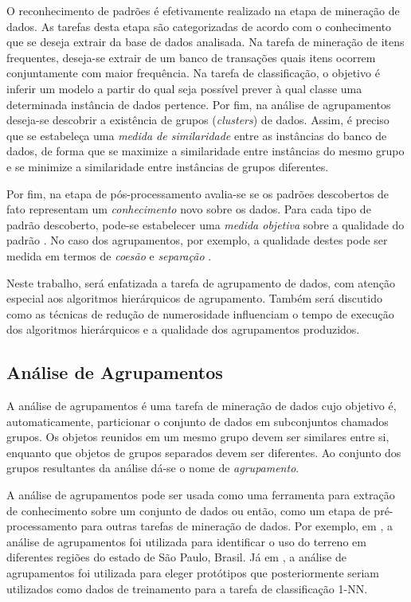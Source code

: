 O reconhecimento de padrões é efetivamente realizado na etapa de mineração de
dados. As tarefas desta etapa são categorizadas de acordo com o conhecimento que
se deseja extrair da base de dados analisada. Na tarefa de mineração de itens
frequentes, deseja-se extrair de um banco de transações quais itens ocorrem
conjuntamente com maior frequência. Na tarefa de classificação, o objetivo é
inferir um modelo a partir do qual seja possível prever à qual classe uma
determinada instância de dados pertence. Por fim, na análise de agrupamentos
deseja-se descobrir a existência de grupos (\emph{clusters}) de dados. Assim, é
preciso que se estabeleça uma \emph{medida de similaridade} entre as instâncias
do banco de dados, de forma que se maximize a similaridade entre instâncias do
mesmo grupo e se minimize a similaridade entre instâncias de grupos diferentes.

Por fim, na etapa de pós-processamento avalia-se se os padrões descobertos de
fato representam um \emph{conhecimento} novo sobre os dados. Para cada tipo
de padrão descoberto, pode-se estabelecer uma \emph{medida objetiva} sobre a
qualidade do padrão \cite{han2011data}. No caso dos agrupamentos, por exemplo,
a qualidade destes pode ser medida em termos de \emph{coesão} e \emph{separação}
\cite{tan2009introducao}.

Neste trabalho, será enfatizada a tarefa de agrupamento de dados, com atenção
especial aos algoritmos hierárquicos de agrupamento. Também será discutido como
as técnicas de redução de numerosidade influenciam o tempo de execução dos
algoritmos hierárquicos e a qualidade dos agrupamentos produzidos.


\subsection{Análise de Agrupamentos}
	\label{subsec:analise_agrupamentos}
	
A análise de agrupamentos é uma tarefa de mineração de dados cujo objetivo é,
automaticamente, particionar o conjunto de dados em subconjuntos chamados
grupos. Os objetos reunidos em um mesmo grupo devem ser similares entre si,
enquanto que objetos de grupos separados devem ser diferentes. Ao conjunto dos
grupos resultantes da análise dá-se o nome de \emph{agrupamento}.

A análise de agrupamentos pode ser usada como uma ferramenta para extração de
conhecimento sobre um conjunto de dados ou então, como um etapa de
pré-processamento para outras tarefas de mineração de dados. Por exemplo, em
\cite{gonccalves2014land}, a análise de agrupamentos foi utilizada para
identificar o uso do terreno em diferentes regiões do estado de São Paulo,
Brasil. Já em \cite{petitjean2014dynamic}, a análise de agrupamentos foi
utilizada para eleger protótipos que posteriormente seriam utilizados como dados
de treinamento para a tarefa de classificação 1-NN.

